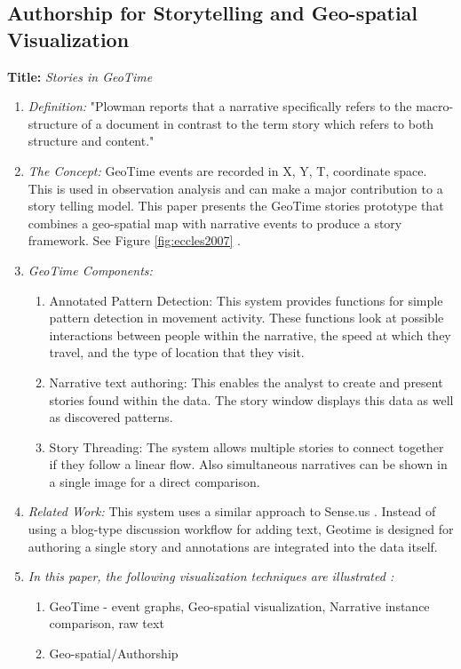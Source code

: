\documentclass{egpubl}
\begin{document}
\subsection{Authorship for Storytelling and Geo-spatial Visualization}

\textbf{Title:} \textit{Stories in GeoTime}
\begin{enumerate}
\item \textit{Definition:} "Plowman \cite{plowman1999} reports that a narrative specifically refers to the macro-structure of a document in contrast to the term story which refers to both structure and content."
\item \textit{The Concept:} GeoTime events are recorded in X, Y, T, coordinate space. This is used in observation analysis and can make a major contribution to a story telling model. This paper presents the GeoTime stories prototype that combines a geo-spatial map with narrative events to produce a story framework. See Figure \ref{fig:eccles2007} \cite{eccles2007}.
\item \textit{GeoTime Components:}
\begin{enumerate}
\item Annotated Pattern Detection: This system provides functions for simple pattern detection in movement activity. These functions look at possible interactions between people within the narrative, the speed at which they travel, and the type of location that they visit.
\item Narrative text authoring: This enables the analyst to create and present stories found within the data. The story window displays this data as well as discovered patterns. 
\item Story Threading: The system allows multiple stories to connect together if they follow a linear flow. Also simultaneous narratives can be shown in a single image for a direct comparison.
\end{enumerate}
\item \textit{Related Work:}  This system uses a similar approach to Sense.us \cite{heer2007}. Instead of using a blog-type discussion workflow for adding text, Geotime is designed for authoring a single story and annotations are integrated into the data itself.
\item \textit{In this paper, the following visualization techniques are illustrated :} 
\begin{enumerate}
\item GeoTime - event graphs, Geo-spatial visualization, Narrative instance comparison, raw text
\item Geo-spatial/Authorship
\end{enumerate}
\end{enumerate}
\end{document}
